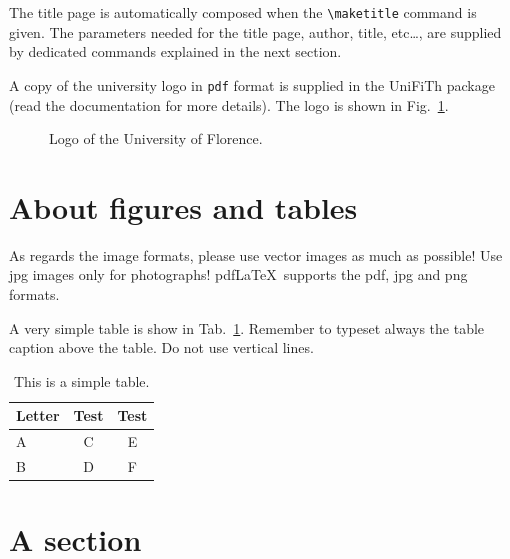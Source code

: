 \documentclass[a4paper,binding=0.6cm]{unifith}
\newcommand{\bs}{\textbackslash}
\begin{document}
The title page is automatically composed when the \texttt{\bs maketitle} command is given.
The parameters needed for the title page, author, title, etc\ldots , are supplied by dedicated commands explained in the next section.

A copy of the university logo in \texttt{pdf} format is supplied in the \textsf{UniFiTh} package (read the documentation for more details). The logo is shown in Fig.~\ref{fig:largenenough}.

\begin{figure}
\centering
{}
\caption{Logo of the University of Florence.}
\label{fig:largenenough}
\end{figure}



\section{About figures and tables}

As regards the image formats, please use vector images as much as possible! Use jpg images only for photographs! pdf\LaTeX\ supports the pdf, jpg and png formats.

A very simple table is show in Tab.~\ref{tab:letters}. Remember to typeset
always the table caption above the table. Do not use vertical lines.

\begin{table}[b]
\caption{This is a simple table.}
\label{tab:letters}
\centering
\begin{tabular}{lcc}
\toprule
Letter & Test & Test \\
\midrule
A & C & E \\
B & D & F \\
\bottomrule
\end{tabular}
\end{table}


\section{A section}
\end{document}

